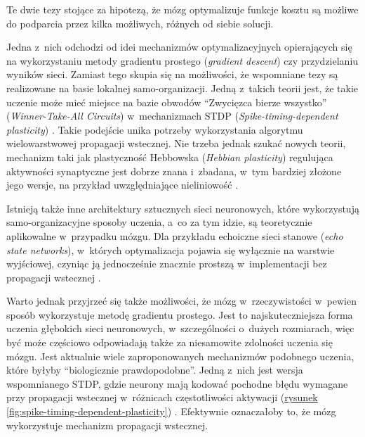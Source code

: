 Te dwie tezy stojące za hipotezą, że mózg optymalizuje funkcje kosztu są możliwe do podparcia przez kilka możliwych, różnych od siebie solucji.

Jedna z~nich odchodzi od idei mechanizmów optymalizacyjnych opierających się na wykorzystaniu metody gradientu prostego (\emph{gradient descent}) czy przydzielaniu wyników sieci.
Zamiast tego skupia się na możliwości, że wspomniane tezy są realizowane na basie lokalnej samo-organizacji.
Jedną z~takich teorii jest, że takie uczenie może mieć miejsce na bazie obwodów ``Zwycięzca bierze wszystko'' (\emph{Winner-Take-All Circuits}) w~mechanizmach STDP (\emph{Spike-timing-dependent plasticity}) \cite{kappel2014stdp}.
Takie podejście unika potrzeby wykorzystania algorytmu wielowarstwowej propagacji wstecznej.
Nie trzeba jednak szukać nowych teorii, mechanizm taki jak plastyczność Hebbowska (\emph{Hebbian plasticity}) regulująca aktywności synaptyczne jest dobrze znana i~zbadana, w~tym bardziej złożone jego wersje, na przykład uwzględniające nieliniowość \cite{brito2016nonlinear}.

Istnieją także inne architektury sztucznych sieci neuronowych, które wykorzystują samo-organizacyjne sposoby uczenia, a~co za tym idzie, są teoretycznie aplikowalne w~przypadku mózgu.
Dla przykładu echoiczne sieci stanowe (\emph{echo state networks}), w~których optymalizacja pojawia się wyłącznie na warstwie wyjściowej, czyniąc ją jednocześnie znacznie prostszą w~implementacji bez propagacji wstecznej \cite{jaeger2004harnessing}.

Warto jednak przyjrzeć się także możliwości, że mózg w~rzeczywistości w~pewien sposób wykorzystuje metodę gradientu prostego.
Jest to najskuteczniejsza forma uczenia głębokich sieci neuronowych, w~szczególności o~dużych rozmiarach, więc być może częściowo odpowiadają także za niesamowite zdolności uczenia się mózgu.
Jest aktualnie wiele zaproponowanych mechanizmów podobnego uczenia, które byłyby ``biologicznie prawdopodobne''.
Jedną z~nich jest wersja wspomnianego STDP, gdzie neurony mają kodować pochodne błędu wymagane przy propagacji wstecznej w~różnicach częstotliwości aktywacji (\hyperref[fig:spike-timing-dependent-plasticity]{rysunek \ref*{fig:spike-timing-dependent-plasticity}}) \cite{hinton2016can}.
Efektywnie oznaczałoby to, że mózg wykorzystuje mechanizm propagacji wstecznej.

